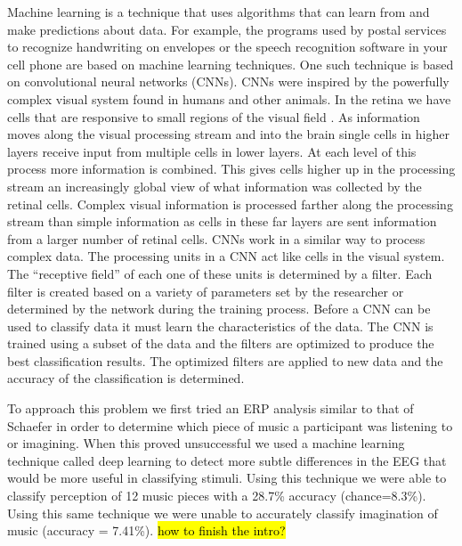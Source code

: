 Machine learning is a technique that uses algorithms that can learn from and make predictions about data.
For example, the programs used by postal services to recognize handwriting on envelopes or the speech recognition software in your cell phone are based on machine learning techniques.
One such technique is based on convolutional neural networks (\acp{CNN}).
\acp{CNN} were inspired by the powerfully complex visual system found in humans and other animals.
In the retina we have cells that are responsive to small regions of the visual field \cite{hubel_receptive_1963}. 
As information moves along the visual processing stream and into the brain single cells in higher layers receive input from multiple cells in lower layers.
At each level of this process more information is combined.
This gives cells higher up in the processing stream an increasingly global view of what information was collected by the retinal cells.
Complex visual information is processed farther along the processing stream than simple information as cells in these far layers are sent information from a larger number of retinal cells.
\acp{CNN} work in a similar way to process complex data. 
The processing units in a \ac{CNN} act like cells in the visual system.
The ``receptive field'' of each one of these units is determined by a filter.
Each filter is created based on a variety of parameters set by the researcher or determined by the network during the training process.
Before a \ac{CNN} can be used to classify data it must learn the characteristics of the data. 
The \ac{CNN} is trained using a subset of the data and the filters are optimized to produce the best classification results. 
The optimized filters are applied to new data and the accuracy of the classification is determined. 

To approach this problem we first tried an ERP analysis similar to that of Schaefer \etal\cite{schaefer_name_2011} in order to determine which piece of music a participant was listening to or imagining.
When this proved unsuccessful we used a machine learning technique called deep learning to detect more subtle differences in the EEG that would be more useful in classifying stimuli. 
Using this technique we were able to classify perception of 12 music pieces with a 28.7\% accuracy (chance=8.3\%).
Using this same technique we were unable to accurately classify imagination of music (accuracy = 7.41\%). 
\hl{how to finish the intro?}